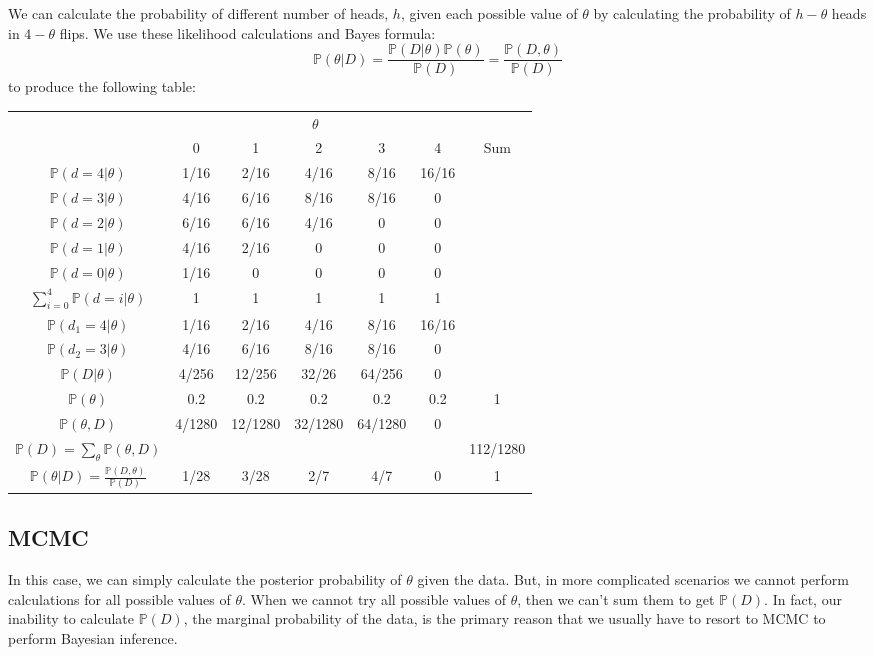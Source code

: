 \documentclass[11pt]{article}
\renewcommand{\Pr}{{\mathbb P}}
\begin{document}
We can calculate the probability of different number of heads, $h$, given each possible value of $\theta$ by calculating the probability of $h-\theta$ heads in $4-\theta$ flips.
We use these likelihood calculations and Bayes formula:
$$ \Pr(\theta|D) = \frac{\Pr(D|\theta)\Pr(\theta)}{\Pr(D)}= \frac{\Pr(D,\theta)}{\Pr(D)}$$ 
to produce the following table:
\begin{table}[htdp]
\begin{center}
\begin{tabular}{|c|c|c|c|c|c|c|}
\hline
& \multicolumn{5}{c|}{$\theta$} &\\
& 0 & 1 & 2 & 3 & 4 & Sum\\
\hline
$\Pr(d=4|\theta)$ & 1/16 & 2/16 & 4/16 & 8/16 & 16/16 & \\
$\Pr(d=3|\theta)$ & 4/16 & 6/16 & 8/16 & 8/16 & 0 & \\
$\Pr(d=2|\theta)$ & 6/16 & 6/16 & 4/16 & 0 & 0 & \\
$\Pr(d=1|\theta)$ & 4/16 & 2/16 & 0 & 0 & 0 & \\
$\Pr(d=0|\theta)$ & 1/16 & 0 & 0 & 0 & 0 & \\
\hline
$\sum_{i=0}^4 \Pr(d=i|\theta)$ & 1 & 1 & 1 & 1 & 1 & \\
\hline
$\Pr(d_1=4|\theta)$ & 1/16 & 2/16 & 4/16 & 8/16 & 16/16 & \\
$\Pr(d_2=3|\theta)$ & 4/16 & 6/16 & 8/16 & 8/16 & 0 & \\
$\Pr(D|\theta)$  & 4/256 & 12/256 & 32/26 & 64/256 & 0 & \\
\hline
$\Pr(\theta)$ & 0.2 & 0.2 & 0.2 & 0.2 & 0.2 & 1\\ 
\hline
$\Pr(\theta,D)$  & 4/1280 & 12/1280 & 32/1280 & 64/1280 & 0 & \\
$\Pr(D) =\sum_{\theta}\Pr(\theta,D)$ & & & & & & 112/1280 \\
\hline
$\Pr(\theta|D) = \frac{\Pr(D,\theta)}{\Pr(D)}$ & 1/28 & 3/28 & 2/7 & 4/7 & 0 & 1\\
\hline
\end{tabular}
\end{center}
\label{default}
\end{table}

\subsection*{MCMC}
In this case, we can simply calculate the posterior probability of $\theta$ given the data.  
But, in more complicated scenarios we cannot perform calculations for all possible values of $\theta$.
When we cannot try all possible values of $\theta$, then we can't sum them to get $\Pr(D)$.
In fact, our inability to calculate $\Pr(D)$, the marginal probability of the data, is the primary reason that we usually have to resort to MCMC to perform Bayesian inference.
\end{document}
